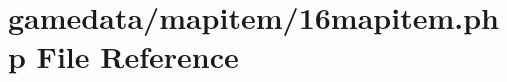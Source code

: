 \hypertarget{16mapitem_8php}{\section{gamedata/mapitem/16mapitem.php File Reference}
\label{16mapitem_8php}
}
